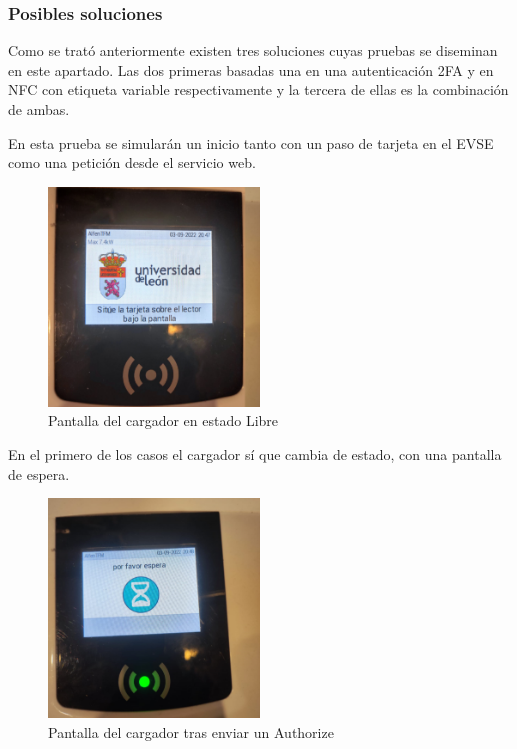 \documentclass[12pt,a4paper,onecolumn,oneside]{report}
\newcounter{subsubsubsection}[subsubsection]
\begin{document}
\subsubsection{Posibles soluciones}

Como se trató anteriormente existen tres soluciones cuyas pruebas se diseminan en este apartado. Las dos primeras basadas una en una autenticación 2FA y en NFC con etiqueta variable respectivamente y la tercera de ellas es la combinación de ambas.


En esta prueba se simularán un inicio tanto con un paso de tarjeta en el EVSE como una petición desde el servicio web.

\begin{figure}[H] 
\centering
  \includegraphics[width=0.5\textwidth]{figuras/prueba1.png}
  \caption[Pantalla del cargador en estado \textit{Libre}]{Pantalla del cargador en estado Libre\\
  }
  \label{fig:prueba1}
\end{figure}

En el primero de los casos el cargador sí que cambia de estado, con una pantalla de espera.

\begin{figure}[H] 
\centering
  \includegraphics[width=0.5\textwidth]{figuras/prueba2.png}
  \caption[Pantalla del cargador tras enviar un \textit{Authorize}]{Pantalla del cargador tras enviar un Authorize\\
  }
  \label{fig:prueba2}
\end{figure}
\end{document}
